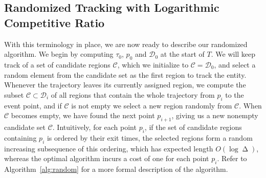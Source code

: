 \documentclass[runningheads]{llncs}
\newcommand {\script} [1] {\ensuremath {\mathcal {#1}}}
\DeclareMathOperator {\ply}{\Delta}
\begin{document}
    \subsection {Randomized Tracking with Logarithmic Competitive Ratio}
      With this terminology in place, we are now ready to describe our randomized algorithm.
      We begin by computing $\tau_0$, $p_0$ and $\script D_0$ at the start of $T$. 
      We will keep track of a set of candidate regions $\script C$, which we initialize to $\script C = \script D_0$, and select a random element from the candidate set as the first region to track the entity.      
      Whenever the trajectory leaves its currently assigned region, we compute the subset $\script C \subset \script D_i$ of all regions that contain the whole
      trajectory from $p_i$ to the event point, and if $\script C$ is not empty
      we select a new region randomly from $\script C$.
      When $\script C$ becomes empty, we have found the next point $p_{i+1}$, giving us a new nonempty candidate set $\script C$. Intuitively, for each point $p_i$, if the set of candidate regions containing $p_i$ is ordered by their exit times, the selected regions form a random increasing subsequence of this ordering, which has expected length $O(\log\ply)$, whereas the optimal algorithm incurs a cost of one for each point $p_i$.
      Refer to Algorithm~\ref {alg:random} for a more formal description of the algorithm.
      
\end{document}
